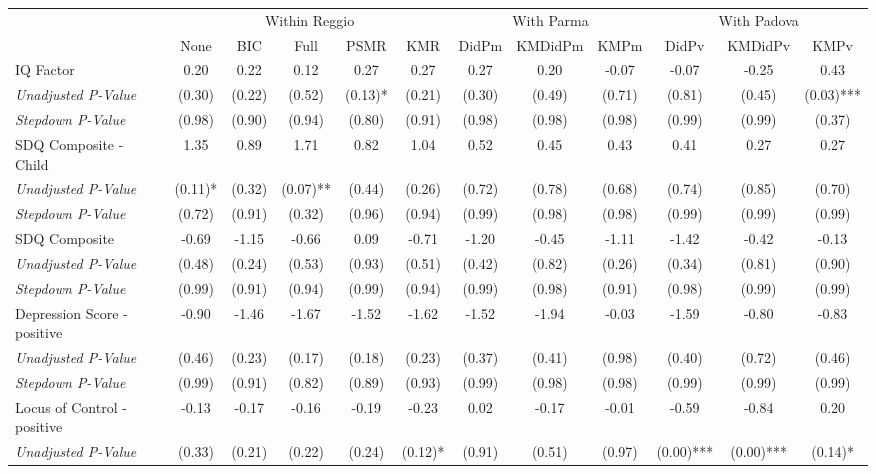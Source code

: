 \begin{tabular}{l c c c c c c c c c c c}
\toprule
& \multicolumn{5}{c}{Within Reggio} & \multicolumn{3}{c}{With Parma} & \multicolumn{3}{c}{With Padova} \\\cmidrule(lr){2-6} \cmidrule(lr){7-9} \cmidrule(lr){10-12}
 & None & BIC & Full & PSMR & KMR & DidPm & KMDidPm & KMPm & DidPv & KMDidPv & KMPv \\
\midrule
IQ Factor & 0.20 & 0.22 & 0.12 & 0.27 & 0.27 & 0.27 & 0.20 & -0.07 & -0.07 & -0.25 & 0.43 \\
\quad \textit{Unadjusted P-Value} & (0.30) & (0.22) & (0.52) & (0.13)* & (0.21) & (0.30) & (0.49) & (0.71) & (0.81) & (0.45) & (0.03)*** \\
\quad \textit{Stepdown P-Value} & (0.98) & (0.90) & (0.94) & (0.80) & (0.91) & (0.98) & (0.98) & (0.98) & (0.99) & (0.99) & (0.37) \\
SDQ Composite - Child & 1.35 & 0.89 & 1.71 & 0.82 & 1.04 & 0.52 & 0.45 & 0.43 & 0.41 & 0.27 & 0.27 \\
\quad \textit{Unadjusted P-Value} & (0.11)* & (0.32) & (0.07)** & (0.44) & (0.26) & (0.72) & (0.78) & (0.68) & (0.74) & (0.85) & (0.70) \\
\quad \textit{Stepdown P-Value} & (0.72) & (0.91) & (0.32) & (0.96) & (0.94) & (0.99) & (0.98) & (0.98) & (0.99) & (0.99) & (0.99) \\
SDQ Composite & -0.69 & -1.15 & -0.66 & 0.09 & -0.71 & -1.20 & -0.45 & -1.11 & -1.42 & -0.42 & -0.13 \\
\quad \textit{Unadjusted P-Value} & (0.48) & (0.24) & (0.53) & (0.93) & (0.51) & (0.42) & (0.82) & (0.26) & (0.34) & (0.81) & (0.90) \\
\quad \textit{Stepdown P-Value} & (0.99) & (0.91) & (0.94) & (0.99) & (0.94) & (0.99) & (0.98) & (0.91) & (0.98) & (0.99) & (0.99) \\
Depression Score - positive & -0.90 & -1.46 & -1.67 & -1.52 & -1.62 & -1.52 & -1.94 & -0.03 & -1.59 & -0.80 & -0.83 \\
\quad \textit{Unadjusted P-Value} & (0.46) & (0.23) & (0.17) & (0.18) & (0.23) & (0.37) & (0.41) & (0.98) & (0.40) & (0.72) & (0.46) \\
\quad \textit{Stepdown P-Value} & (0.99) & (0.91) & (0.82) & (0.89) & (0.93) & (0.99) & (0.98) & (0.98) & (0.99) & (0.99) & (0.99) \\
Locus of Control - positive & -0.13 & -0.17 & -0.16 & -0.19 & -0.23 & 0.02 & -0.17 & -0.01 & -0.59 & -0.84 & 0.20 \\
\quad \textit{Unadjusted P-Value} & (0.33) & (0.21) & (0.22) & (0.24) & (0.12)* & (0.91) & (0.51) & (0.97) & (0.00)*** & (0.00)*** & (0.14)* \\

\end{tabular}
